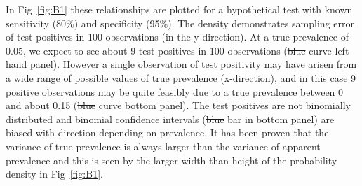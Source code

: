 \documentclass[a4paper, 12pt, twoside]{article}
\providecommand{\DIFaddtex}[1]{{\protect\color{blue}\uwave{#1}}} %
\providecommand{\DIFdeltex}[1]{{\protect\color{red}\sout{#1}}}                      %
\providecommand{\DIFaddbegin}{} %
\providecommand{\DIFaddend}{} %
\providecommand{\DIFdelbegin}{} %
\providecommand{\DIFdelend}{} %
\providecommand{\DIFadd}[1]{\texorpdfstring{\DIFaddtex{#1}}{#1}} %
\providecommand{\DIFdel}[1]{\texorpdfstring{\DIFdeltex{#1}}{}} %
\begin{document}
In Fig~\ref{fig:B1} these relationships are plotted for a hypothetical test with known sensitivity (80\%) and specificity (95\%). The density demonstrates sampling error of test positives in 100 observations (in the y-direction). At a true prevalence of 0.05, we expect to see about 9 test positives in 100 observations (\DIFdelbegin \DIFdel{blue }\DIFdelend \DIFaddbegin \DIFadd{green }\DIFaddend curve left hand panel). However a single observation of test positivity may have arisen from a wide range of possible values of true prevalence (x-direction), and in this case 9 positive observations may be quite feasibly due to a true prevalence between 0 and about 0.15 (\DIFdelbegin \DIFdel{blue }\DIFdelend \DIFaddbegin \DIFadd{green }\DIFaddend curve bottom panel). The test positives are not binomially distributed and binomial confidence intervals (\DIFdelbegin \DIFdel{blue }\DIFdelend \DIFaddbegin \DIFadd{horizontal }\DIFaddend bar in bottom panel) are biased with direction depending on prevalence. It has been proven that the variance of true prevalence is always larger than the variance of apparent prevalence \cite{rogan1978, lang2014} and this is seen by the larger width than height of the probability density in Fig~\ref{fig:B1}.
\end{document}
